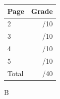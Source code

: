 \documentclass[12pt]{article}
\newcommand{\skipline}{\vspace{12pt}}
\begin{document}
\begin{table}[hbt]
\begin{center}
\begin{tabular}{|l|r|} \hline
Page&Grade\\
\hline \hline
\cline{1-2} 2 & \enspace\enspace\enspace\enspace\enspace\enspace/10\\
\cline{1-2} 3 & \enspace\enspace\enspace\enspace\enspace\enspace/10\\
\cline{1-2} 4 & \enspace\enspace\enspace\enspace\enspace\enspace/10\\
\cline{1-2} 5 & \enspace\enspace\enspace\enspace\enspace\enspace/10\\
\cline{1-2} Total & \enspace\enspace\enspace\enspace\enspace\enspace/40\\
\hline
\end{tabular}

\skipline

\skipline

\skipline

B
\end{center}
\end{table}
\newpage
\end{document}
